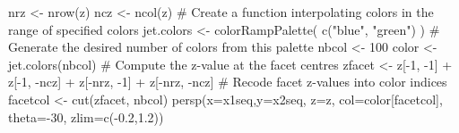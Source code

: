 \begin{Schunk}
\begin{Sinput}
 nrz <- nrow(z)
 ncz <- ncol(z)
 # Create a function interpolating colors in the range of specified colors
 jet.colors <- colorRampPalette( c("blue", "green") )
 # Generate the desired number of colors from this palette
 nbcol <- 100
 color <- jet.colors(nbcol)
 # Compute the z-value at the facet centres
 zfacet <- z[-1, -1] + z[-1, -ncz] + z[-nrz, -1] + z[-nrz, -ncz]
 # Recode facet z-values into color indices
 facetcol <- cut(zfacet, nbcol)
 persp(x=x1seq,y=x2seq, z=z, col=color[facetcol], theta=-30, zlim=c(-0.2,1.2))
\end{Sinput}
\end{Schunk}
